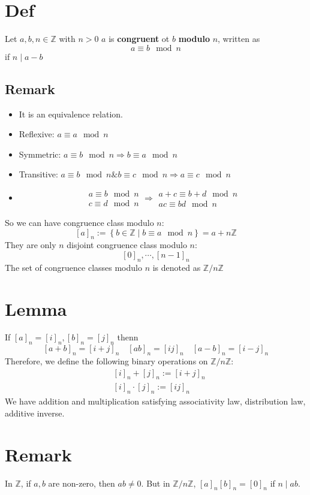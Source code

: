 \documentclass{book}
\begin{document}
\section{Def} Let $a,b,n\in \mathbb{Z}$ with $n>0$ $a$ is \textbf{congruent} ot $b$ \textbf{modulo} $n$, written as $$a\equiv b\mod n$$ if $n\mid a-b$
\subsection*{Remark}
\begin{itemize}
	\item It is an equivalence relation.
	\item Reflexive: $a\equiv a\mod n$
	\item Symmetric: $a\equiv b\mod n\Rightarrow b\equiv a\mod n$
	\item Transitive: $a\equiv b\mod n\& b\equiv c\mod n\Rightarrow a\equiv c\mod n$
	\item $$\begin{aligned}
		a\equiv b\mod n\\c\equiv d\mod n
	\end{aligned}\Rightarrow\begin{aligned}
		a+c\equiv b+d\mod n\\ac\equiv bd\mod n
	\end{aligned}$$
\end{itemize}

So we can have congruence class modulo $n$:
$$[a]_n:=\left\{b\in \mathbb{Z}\mid b\equiv a\mod n\right\}=a+n\mathbb{Z}$$
They are only $n$ disjoint congruence class modulo $n$:
$$[0]_n,\cdots, [n-1]_n$$
The set of congruence classes modulo $n$ is denoted as $\mathbb{Z}/n\mathbb{Z}$
\section{Lemma}
If $[a]_n=[i]_n,[b]_n=[j]_n$ thenn $$[a+b]_n=[i+j]_n\quad [ab]_n=[ij]_n\quad [a-b]_n=[i-j]_n$$
Therefore, we define the following binary operations on $\mathbb{Z}/n\mathbb{Z}$:
$$
\begin{aligned}
	&[i]_n+[j]_n:=[i+j]_n\\
	&[i]_n\cdot[j]_n:=[ij]_n
\end{aligned}
$$
We have addition and multiplication satisfying associativity law, distribution law, additive inverse.
\section{Remark}
In $\mathbb{Z}$, if $a,b$ are non-zero, then $ab\neq 0$. But in $\mathbb{Z}/n\mathbb{Z}$, $[a]_n[b]_n=[0]_n$ if $n\mid ab$.
\end{document}
